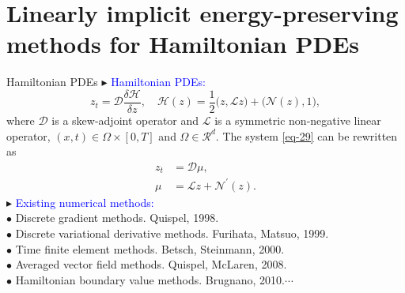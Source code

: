 \documentclass[10pt]{beamer}
\begin{document}
	
\section{Linearly implicit energy-preserving methods for Hamiltonian PDEs}
\begin{frame}{Hamiltonian PDEs}
\textcolor[rgb]{0,0,1}{$\blacktriangleright$} \textcolor{blue}{Hamiltonian PDEs:}
\begin{equation}\label{eq-29}
z_t=\mathcal{D}\frac{\delta \mathcal{H}}{\delta z},\quad \mathcal{H}(z)=\frac{1}{2}\big(z,\mathcal{L}z\big)+\big(\mathcal{N}(z),1\big),
\end{equation} 
where $\mathcal{D}$ is a skew-adjoint operator and $\mathcal{L}$ is a symmetric non-negative linear operator, $(x,t) \in \Omega\times[0,T]$ and $\Omega \in \mathcal{R}^d$.  The system \eqref{eq-29} can be rewritten as
\begin{equation}\label{eq-30}
\begin{aligned}
z_t&=\mathcal{D}\mu,\\
\mu&=\mathcal{L}z+\mathcal{N}^\prime(z).
\end{aligned}
\end{equation} 
\vspace{2mm}
\textcolor[rgb]{0,0,1}{$\blacktriangleright$} \textcolor{blue}{Existing numerical methods:}\\
\quad\textcolor[rgb]{0,0,1}{$\bullet$} Discrete gradient methods. Quispel, 1998.\\
\quad\textcolor[rgb]{0,0,1}{$\bullet$} Discrete variational derivative methods. Furihata, Matsuo, 1999.\\
\quad\textcolor[rgb]{0,0,1}{$\bullet$} Time finite element methods. Betsch, Steinmann, 2000.\\
\quad\textcolor[rgb]{0,0,1}{$\bullet$} Averaged vector field methods. Quispel, McLaren, 2008.\\
\quad\textcolor[rgb]{0,0,1}{$\bullet$} Hamiltonian boundary value methods. Brugnano, 2010.$\cdots$\\
\end{frame}
\end{document}
